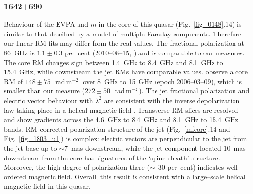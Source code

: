 \documentclass[a4paper,fleqn,usenatbib,useAMS]{mnras}
\newcommand{\rmu}{\,rad\,m$^{-2}$\,} %
\begin{document}
\subsubsection{1642$+$690}
Behaviour of the EVPA and $m$ in the core of this quasar (Fig.~\ref{fig_0148}.14) is similar to that descibed by a model of multiple Faraday components. 
Therefore our linear RM fits may differ from the real values. 
The fractional polarization at 86~GHz is $1.1\pm0.3$ per~cent (2010--08--15, \citealt{agudo_etal14}) and is comparable to our measures.
The core RM changes sign between 1.4~GHz to 8.4~GHz and 8.1~GHz to 15.4~GHz, while downstream the jet RMs have comparable values.
\citet{hovatta_etal12} observe a core RM of $148\pm75$~\rmu\ over 8~GHz to 15~GHz (epoch 2006--03--09), which is smaller than our measure ($272\pm50$~\rmu).
The jet fractional polarization and electric vector behaviour with $\lambda^2$ are consistent with the inverse depolarization law taking place in a helical magnetic field \citep{homan_12}.
Transverse RM slices are resolved and show gradients across the 4.6~GHz to 8.4~GHz and 8.1~GHz to 15.4~GHz bands.
RM--corrected polarization structure of the jet (Fig,~\ref{mfcore}.14 and Fig.~\ref{fig_1803_u1}) is complex: electric vectors are perpendicular to the jet from the jet base up to $\sim7$~mas downstream, while the jet component located 10~mas downstream from the core has signatures of the `spine-sheath' structure. 
Moreover, the high degree of polarization there ($\sim$~30 per~cent) indicates well-ordered magnetic field.
Overall, this result is consistent with a large--scale helical magnetic field in this quasar.
 
\end{document}
